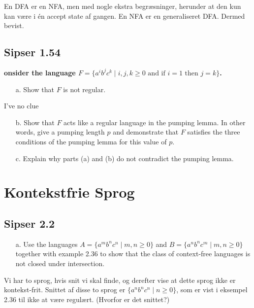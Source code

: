 En DFA er en NFA, men med nogle ekstra begræsninger, herunder at den kun kan være i én accept state af gangen. En NFA er en generaliseret DFA. Dermed bevist.

\subsection*{Sipser 1.54}%
\label{subsec:sipser1.54}
\textbf{onsider the language \( F = \{a^i b^j c^k \mid i,j,k \geq 0 \text{ and if } i = 1 \text{ then } j = k\} \).}

\begin{enumerate}
    \item[a.] Show that \( F \) is not regular.
\end{enumerate}

I've no clue

\begin{enumerate}
    \item[b.] Show that \( F \) acts like a regular language in the pumping lemma. In other words, give a pumping length \( p \) and demonstrate that \( F \) satisfies the three conditions of the pumping lemma for this value of \( p \).
\end{enumerate}
\begin{enumerate}
    \item[c.] Explain why parts (a) and (b) do not contradict the pumping lemma.
\end{enumerate}

\section{Kontekstfrie Sprog}
\label{sec:2exercises}

\noindent
\subsection*{Sipser 2.2}
\noindent
\begin{enumerate}
  \item[a.] Use the languages $A = \{a^{m}b^{n}c^{n} \; | \; m,n \ge 0\}$ and $B = \{a^{n}b^{n}c^{m} \; | \; m,n \ge 0\}$ together with example 2.36 to show that the class of context-free languages is not closed under intersection.
\end{enumerate}

Vi har to sprog, hvis snit vi skal finde, og derefter vise at dette sprog ikke er kontekst-frit. Snittet af disse to sprog er $\{a^{n}b^{n}c^{n}\; | \; n \ge 0\}$, som er vist i eksempel 2.36 til ikke at være regulært. (Hvorfor er det snittet?)

